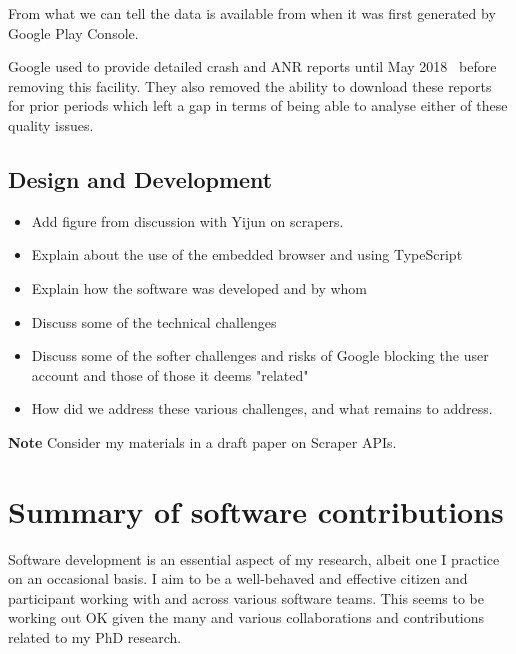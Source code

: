 From what we can tell the data is available from when it was first generated by Google Play Console.

Google used to provide detailed crash and ANR reports until May 2018~\cite{google_play_download_and_export_monthly_reports} before removing this facility. They also removed the ability to download these reports for prior periods which left a gap in terms of being able to analyse either of these quality issues.

\subsection{Design and Development}
\begin{itemize}
    \item Add figure from discussion with Yijun on scrapers.
    \item Explain about the use of the embedded browser and using TypeScript
    \item Explain how the software was developed and by whom
    \item Discuss some of the technical challenges
    \item Discuss some of the softer challenges and risks of Google blocking the user account and those of those it deems "related"
    \item How did we address these various challenges, and what remains to address.
\end{itemize}

\textbf{Note} Consider my materials in a draft paper on Scraper APIs.

\section{Summary of software contributions}
Software development is an essential aspect of my research, albeit one I practice on an occasional basis. I aim to be a well-behaved and effective citizen and participant working with and across various software teams. This seems to be working out OK given the many and various collaborations and contributions related to my PhD research.

